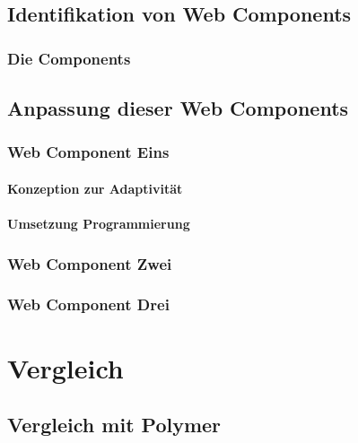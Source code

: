 \documentclass[12pt, paper=a4, bibtotoc, toc=listof, headsepline=true]{scrreprt}
\begin{document}
	\section{Identifikation von Web Components}
		\subsection{Die Components}
	\section{Anpassung dieser Web Components}
		\subsection{Web Component Eins}
			\subsubsection{Konzeption zur Adaptivität}
			\subsubsection{Umsetzung Programmierung}
		\subsection{Web Component Zwei}
		\subsection{Web Component Drei}
\chapter{Vergleich}
	\section{Vergleich mit Polymer}

	\printbibliography
\end{document}
